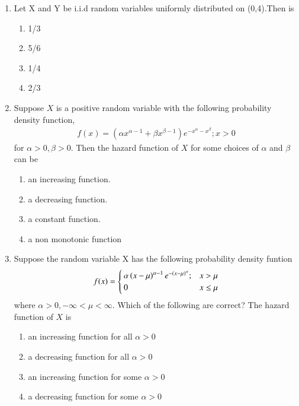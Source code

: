 \begin{enumerate}[label=\thesection.\arabic*.,ref=\thesection.\theenumi]
\item Let X and Y be i.i.d random variables uniformly distributed on (0,4).Then  is
\begin{enumerate}
    \item 1/3
    \item 5/6
    \item 1/4
    \item 2/3
\end{enumerate}
\solution

%
\item Suppose $X$ is a positive random variable with the following probability density function,
\begin{align*}
f(x) = (\alpha x^{\alpha -1} + \beta x^{\beta-1} ) e^{-x^{\alpha}-x^{\beta}} ; x>0
\end{align*}
for $ \alpha >0, \beta >0$.
Then the hazard function of $X$ for some choices of $\alpha$ and $\beta$ can be
\begin{enumerate}
    \item an increasing function.
    \item a decreasing function.
    \item a constant function.
    \item a non monotonic function
\end{enumerate}
%
\solution

%
\item Suppose the random variable X has the following probability density funtion 
\begin{align}
    f(x)=\begin{cases}\alpha\left(x-\mu\right)^{\alpha -1}e^{-\left(x-\mu\right)^\alpha};&x>\mu\\
                        0                               &x\leq\mu    
    \end{cases}\nonumber
\end{align}
where $\alpha>0,-\infty <\mu<\infty$. Which of the following are correct? The hazard function of $X$ is
\begin{enumerate}
    \item an increasing function for all $\alpha>0$
    \item a decreasing function for all $\alpha >0$
    \item an increasing function for some $\alpha>0$
    \item a decreasing function for some $\alpha>0$
\end{enumerate}
%
\solution

%
%

\end{enumerate}
